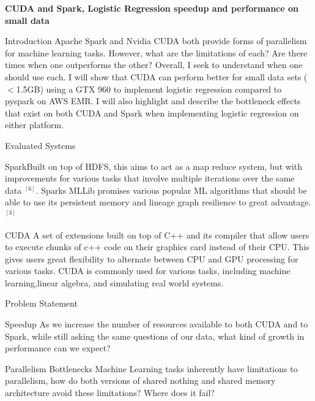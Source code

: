 \documentclass[11pt]{article}
\begin{document}
\begin{title}
	{\Large\bf CUDA and Spark, Logistic Regression speedup and performance on small data}
\end{title}

\author{\bf Alexander Van Roijen}

\maketitle

\begin{section}{Introduction}
Apache Spark and Nvidia CUDA both provide forms of parallelism for machine learning tasks. However, what are the limitations of each? Are there times when one outperforms the other? Overall, I seek to understand when one should use each. I will show that CUDA can perform better for small data sets ($<$1.5GB) using a GTX 960 to implement logistic regression compared to pyspark on AWS EMR. I will also highlight and describe the bottleneck effects that exist on both CUDA and Spark when implementing logistic regression on either platform.
\end{section}

\begin{section}{Evaluated Systems}
	\begin{subsection}{Spark}Built on top of HDFS, this aims to act as a map reduce system, but with improvements for various tasks that involve multiple iterations over the same data $^{[6]}$. Sparks MLLib promises various popular ML algorithms that should be able to use its persistent memory and lineage graph resilience to great advantage. $^{[3]}$
	\end{subsection}
	\begin{subsection}{CUDA} A set of extensions built on top of C++ and its compiler that allow users to execute chunks of c++ code on their graphics card instead of their CPU. This gives users great flexibility to alternate between CPU and GPU processing for various tasks. CUDA is commonly used for various tasks, including machine learning,linear algebra, and simulating real world systems.
	\end{subsection}
\end{section}

\begin{section}{Problem Statement}
	\begin{subsection}{Speedup}
		As we increase the number of resources available to both CUDA and to Spark, while still asking the same questions of our data, what kind of growth in performance can we expect?
	\end{subsection}
	\begin{subsection}{Parallelism Bottlenecks}
		Machine Learning tasks inherently have limitations to parallelism, how do both versions of shared nothing and shared memory architecture avoid these limitations? Where does it fail?
	\end{subsection}
\end{section}
\end{document}
